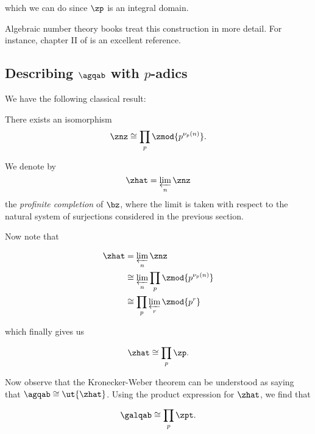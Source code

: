 which we can do since $\zp$ is an integral domain.

Algebraic number theory books treat this construction in more detail. For
instance, chapter II of \cite{neukirch} is an excellent reference.

\subsection{Describing $\agqab$ with $p$-adics}

We have the following classical result:

\begin{thm}
  There exists an isomorphism
  \[ \znz \cong \prod_p \zmod {p^{\nu_p(n)}}. \]
\end{thm}

\begin{defn}
  We denote by
  \[ \zhat = \varprojlim_n \znz \]
  the \textit{profinite completion} of $\bz$, where the limit is taken with
  respect to the natural system of surjections considered in the previous section.
\end{defn}

Now note that

\begin{align*}
  \zhat &= \varprojlim_n \znz \\
        &\cong \varprojlim_n \prod_p \zmod {p^{\nu_p(n)}} \\
        &\cong \prod_p \varprojlim_r \zmod {p^r}
\end{align*}

which finally gives us

\[ \zhat \cong \prod_p \zp. \]

Now observe that the Kronecker-Weber theorem can be understood as saying that
$\agqab \cong \ut{\zhat}$. Using the product expression for $\zhat$, we find
that

\[ \galqab \cong \prod_p \zpt. \]




